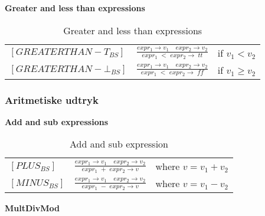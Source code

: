 \textbf{Greater and less than expressions}

    
    
    \bgroup
    \def\arraystretch{3}
    \begin{table}[H]
    \centering
    \begin{tabular}{l c l}
        
        $[GREATERTHAN-T_{BS}]$ &$\frac{expr_1 \rightarrow v_1 \quad expr_2 \rightarrow v_2}{expr_1\;<\;expr_2 \rightarrow \; tt}$ & if $v_1 < v_2$ \\
        
        $[GREATERTHAN-\bot_{BS}]$ &$\frac{expr_1 \rightarrow v_1 \quad expr_2 \rightarrow v_2}{expr_1\;<\;expr_2 \rightarrow \; ff}$ & if $v_1 \geq v_2$ \\
        
    \end{tabular}
    \caption{Greater and less than expressions}
    \label{tab:greaterexpr}
    \end{table}
    \egroup

\subsubsection{Aritmetiske udtryk}

\textbf{Add and sub expressions}

    \bgroup
    \def\arraystretch{3}
    \begin{table}[H]
    \centering
    \begin{tabular}{l c l}
        
        $[PLUS_{BS}]$ &$\frac{expr_1 \rightarrow v_1 \quad expr_2 \rightarrow v_2}{expr_1\;+\;expr_2 \rightarrow v}$ & where $v = v_1 + v_2$ \\
        
        $[MINUS_{BS}]$ &$\frac{expr_1 \rightarrow v_1 \quad expr_2 \rightarrow v_2}{expr_1\;-\;expr_2 \rightarrow v}$ & where $v = v_1 - v_2$ \\
        
    \end{tabular}
    \caption{Add and sub expression}
    \label{tab:addandsub}
    \end{table}
    \egroup

    
  
\textbf{MultDivMod}

    
    
